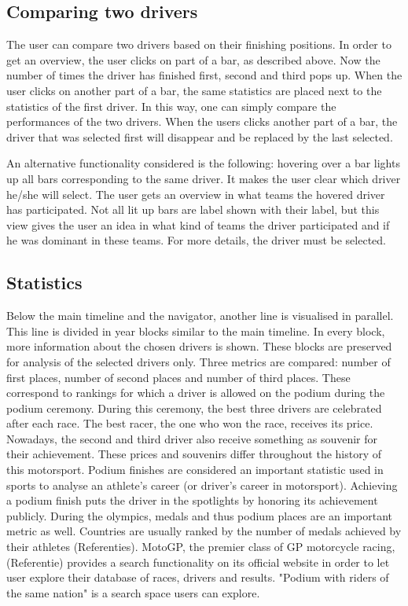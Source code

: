 \documentclass{sigchi}
\begin{document}
\subsection{Comparing two drivers}

The user can compare two drivers based on their finishing positions. In order to get an overview, the user clicks on part of a bar, as described above. Now the number of times the driver has finished first, second and third pops up. When the user clicks on another part of a bar, the same statistics are placed next to the statistics of the first driver. In this way, one can simply compare the performances of the two drivers. When the users clicks another part of a bar, the driver that was selected first will disappear and be replaced by the last selected.

An alternative functionality considered is the following: hovering over a bar lights up all bars corresponding to the same driver. It makes the user clear which driver he/she will select. The user gets an overview in what teams the hovered driver has participated. Not all lit up bars are label shown with their label, but this view gives the user an idea in what kind of teams the driver participated and if he was dominant in these teams. For more details, the driver must be selected.

\subsection{Statistics}

Below the main timeline and the navigator, another line is visualised in parallel. This line is divided in year blocks similar to the main timeline. In every block, more information about the chosen drivers is shown. These blocks are preserved for analysis of the selected drivers only. Three metrics are compared: number of first places, number of second places and number of third places. These correspond to rankings for which a driver is allowed on the podium during the podium ceremony. During this ceremony, the best three drivers are celebrated after each race. The best racer, the one who won the race, receives its price. Nowadays, the second and third driver also receive something as souvenir for their achievement. These prices and souvenirs differ throughout the history of this motorsport.  Podium finishes are considered an important statistic used in sports to analyse an athlete's career (or driver's career in motorsport). Achieving a podium finish puts the driver in the spotlights by honoring its achievement publicly. During the olympics, medals and thus podium places are an important metric as well. Countries are usually ranked by the number of medals achieved by their athletes (Referenties). MotoGP, the premier class of GP motorcycle racing, (Referentie) provides a search functionality on its official website in order to let user explore their database of races, drivers and results. "Podium with riders of the same nation" is a search space users can explore.
\end{document}
